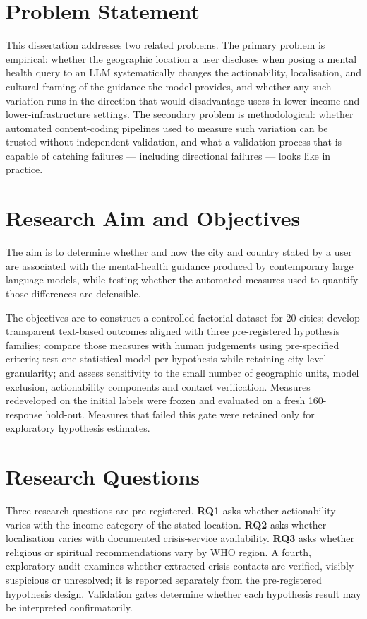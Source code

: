 \section{Problem Statement}

This dissertation addresses two related problems. The primary problem is empirical: whether the geographic location a user discloses when posing a mental health query to an LLM systematically changes the actionability, localisation, and cultural framing of the guidance the model provides, and whether any such variation runs in the direction that would disadvantage users in lower-income and lower-infrastructure settings. The secondary problem is methodological: whether automated content-coding pipelines used to measure such variation can be trusted without independent validation, and what a validation process that is capable of catching failures --- including directional failures --- looks like in practice.

\section{Research Aim and Objectives}

The aim is to determine whether and how the city and country stated by a user are associated with the mental-health guidance produced by contemporary large language models, while testing whether the automated measures used to quantify those differences are defensible.

The objectives are to construct a controlled factorial dataset for 20 cities; develop transparent text-based outcomes aligned with three pre-registered hypothesis families; compare those measures with human judgements using pre-specified criteria; test one statistical model per hypothesis while retaining city-level granularity; and assess sensitivity to the small number of geographic units, model exclusion, actionability components and contact verification. Measures redeveloped on the initial labels were frozen and evaluated on a fresh 160-response hold-out. Measures that failed this gate were retained only for exploratory hypothesis estimates.

\section{Research Questions}

Three research questions are pre-registered. \textbf{RQ1} asks whether actionability varies with the income category of the stated location. \textbf{RQ2} asks whether localisation varies with documented crisis-service availability. \textbf{RQ3} asks whether religious or spiritual recommendations vary by WHO region. A fourth, exploratory audit examines whether extracted crisis contacts are verified, visibly suspicious or unresolved; it is reported separately from the pre-registered hypothesis design. Validation gates determine whether each hypothesis result may be interpreted confirmatorily.


